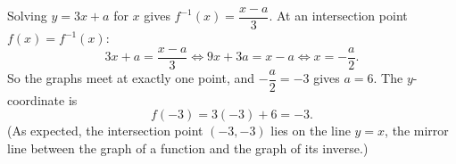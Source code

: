 Solving $y=3x+a$ for $x$ gives $f^{-1}(x)=\dfrac{x-a}{3}$. At an intersection point $f(x)=f^{-1}(x)$:
\[
3x+a=\dfrac{x-a}{3}\iff 9x+3a=x-a\iff x=-\dfrac {a}{2} .
\]
So the graphs meet at exactly one point, and $-\dfrac {a}{2}=-3$ gives $a=6$. The $y$-coordinate is
\[
f(-3)=3(-3)+6=\boxed{-3}.
\]
(As expected, the intersection point $(-3,-3)$ lies on the line $y=x$, the mirror line between the graph of a function and the graph of its inverse.)
